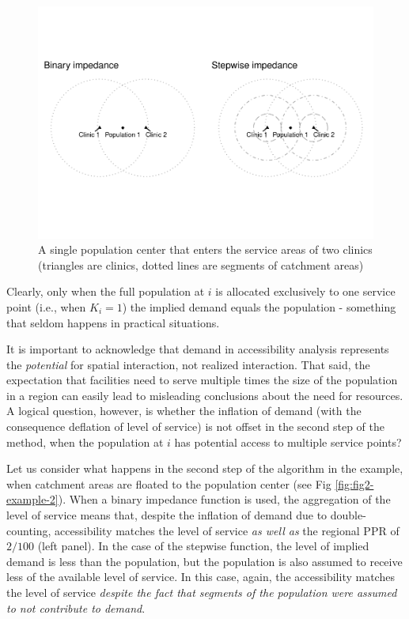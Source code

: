 \documentclass[10pt,letterpaper]{article}
\begin{document}
\begin{figure}
\includegraphics[width=0.95\linewidth]{Supply_and_Demand_Inflation_in_FCA_Methods_v2.1_files/figure-latex/fig1-example-1-1} \caption{\label{fig:fig1-example-1}A single population center that enters the service areas of two clinics (triangles are clinics, dotted lines are segments of catchment areas)}\label{fig:fig1-example-1}
\end{figure}

Clearly, only when the full population at \(i\) is allocated exclusively
to one service point (i.e., when \(K_i=1\)) the implied demand equals
the population - something that seldom happens in practical situations.

It is important to acknowledge that demand in accessibility analysis
represents the \emph{potential} for spatial interaction, not realized
interaction. That said, the expectation that facilities need to serve
multiple times the size of the population in a region can easily lead to
misleading conclusions about the need for resources. A logical question,
however, is whether the inflation of demand (with the consequence
deflation of level of service) is not offset in the second step of the
method, when the population at \(i\) has potential access to multiple
service points?

Let us consider what happens in the second step of the algorithm in the
example, when catchment areas are floated to the population center (see
Fig \ref{fig:fig2-example-2}). When a binary impedance function is used,
the aggregation of the level of service means that, despite the
inflation of demand due to double-counting, accessibility matches the
level of service \emph{as well as} the regional PPR of \(2/100\) (left
panel). In the case of the stepwise function, the level of implied
demand is less than the population, but the population is also assumed
to receive less of the available level of service. In this case, again,
the accessibility matches the level of service \emph{despite the fact
that segments of the population were assumed to not contribute to
demand}.
\end{document}

